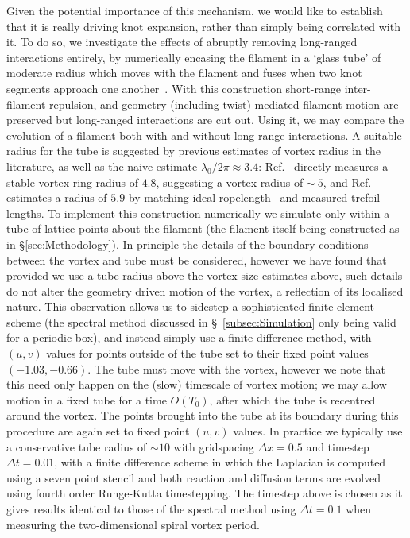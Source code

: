 Given the potential importance of this mechanism, we would like to establish that it is really driving knot expansion, rather than simply being correlated with it. To do so, we investigate the effects of abruptly removing long-ranged interactions entirely, by numerically encasing the filament in a `glass tube' of moderate radius which moves with the filament and fuses when two knot segments approach one another~\citep{Winfree1983b}. With this construction short-range inter-filament repulsion, and geometry (including twist) mediated filament motion are preserved but long-ranged interactions are cut out. Using it, we may compare the evolution of a filament both with and without long-range interactions. A suitable radius for the tube is suggested by previous estimates of vortex radius in the literature, as well as the naive estimate $\lambda_0/2 \pi \approx 3.4$: Ref.~\citep{Courtemanche1990} directly measures a stable vortex ring radius of $4.8$, suggesting a vortex radius of $\sim~5$, and Ref.~\citep{Maucher2017} estimates a radius of $5.9$ by matching ideal ropelength~\citep{Cantarella2011} and measured trefoil lengths. To implement this construction numerically we simulate only within a tube of lattice points about the filament (the filament itself being constructed as in \S\ref{sec:Methodology}). In principle the details of the boundary conditions between the vortex and tube must be considered, however we have found that provided we use a tube radius above the vortex size estimates above, such details do not alter the geometry driven motion of the vortex, a reflection of its localised nature. This observation allows us to sidestep a sophisticated finite-element scheme (the spectral method discussed in \S~\ref{subsec:Simulation} only being valid for a periodic box), and instead simply use a finite difference method, with $(u,v)$ values for points outside of the tube set to their fixed point values $(-1.03,-0.66)$. The tube must move with the vortex, however we note that this need only happen on the (slow) timescale of vortex motion; we may allow motion in a fixed tube for a time $O(T_0)$, after which the tube is recentred around the vortex. The points brought into the tube at its boundary during this procedure are again set to fixed point $(u,v)$ values. In practice we typically use a conservative tube radius of $\sim 10$ with gridspacing $\Delta x = 0.5$ and timestep $\Delta t = 0.01$, with a finite difference scheme in which the Laplacian is computed using a seven point stencil and both reaction and diffusion terms are evolved using fourth order Runge-Kutta timestepping. The timestep above is chosen as it gives results identical to those of the spectral method using $\Delta t = 0.1$ when measuring the two-dimensional spiral vortex period. 

